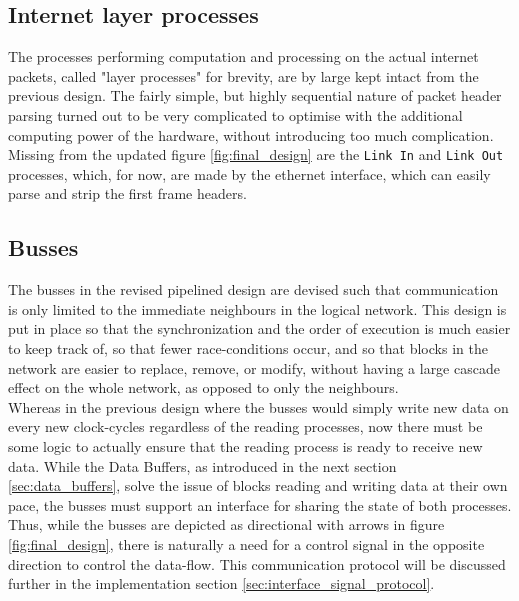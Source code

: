\subsection{Internet layer processes} \label{sec:layer_processes}
The processes performing computation and processing on the actual internet 
packets, called "layer processes" for brevity, are by large kept intact from the 
previous design. The fairly simple, but highly sequential nature of packet 
header parsing turned out to be very complicated to optimise with the additional
computing power of the hardware, without introducing too much complication.\\
Missing from the updated figure \ref{fig:final_design} are the \texttt{Link In}
and \texttt{Link Out} processes, which, for now, are made by the ethernet 
interface, which can easily parse and strip the first frame headers.

\subsection{Busses}
The busses in the revised pipelined design are devised such that communication 
is only limited to the immediate neighbours in the logical network. This design
is put in place so that the synchronization and the order of execution is much 
easier to keep track of, so that fewer race-conditions occur, and so that blocks 
in the network are easier to replace, remove, or modify, without having a large
cascade effect on the whole network, as opposed to only the neighbours.\\
Whereas in the previous design where the busses would simply write new data on
every new clock-cycles regardless of the reading processes, now there must be 
some logic to actually ensure that the reading process is ready to receive new 
data. While the Data Buffers, as introduced in the next section \ref{sec:data_buffers},
solve the issue of blocks reading and writing data at their own pace, the busses
must support an interface for sharing the state of both processes. Thus, while 
the busses are depicted as directional with arrows in figure \ref{fig:final_design},
there is naturally a need for a control signal in the opposite direction to 
control the data-flow. This communication protocol will be discussed further in 
the implementation section \ref{sec:interface_signal_protocol}.


